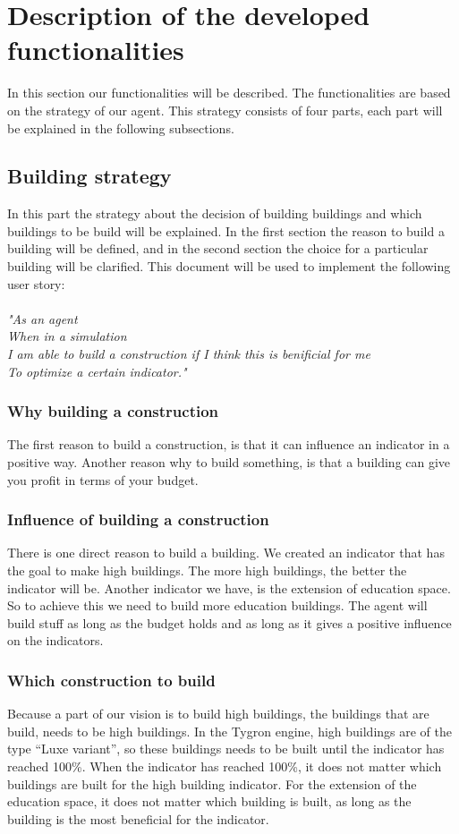 \section{Description of the developed functionalities}
In this section our functionalities will be described. The functionalities are based on the strategy of our agent. This strategy consists of four parts, each part will be explained in the following subsections.

\subsection{Building strategy}
In this part the strategy about the decision of building buildings and which buildings to be build will be explained. In the first section the reason to build a building will be defined, and in the second section the choice for a particular building will be clarified. This document will be used to implement the following user story:\\
\\
\textit{"As an agent\\
When in a simulation\\
I am able to build a construction if I think 
this is benificial for me\\
To optimize a certain indicator."}

\subsubsection{Why building a construction}
The first reason to build a construction, is that it can influence an indicator in a positive way. Another reason why to build something, is that a building can give you profit in terms of your budget.

\subsubsection{Influence of building a construction}
There is one direct reason to build a building. We created an indicator that has the goal to make high buildings. The more high buildings, the better the indicator will be. Another indicator we have, is the extension of education space. So to achieve this we need to build more education buildings. The agent will build stuff as long as the budget holds and as long as it gives a positive influence on the indicators.

\subsubsection{Which construction to build}
Because a part of our vision is to build high buildings, the buildings that are build, needs to be high buildings. In the Tygron engine, high buildings are of the type “Luxe variant”, so these buildings needs to be built until the indicator has reached 100\%. When the indicator has reached 100\%, it does not matter which buildings are built for the high building indicator. For the extension of the education space, it does not matter which building is built, as long as the building is the most beneficial for the indicator.

